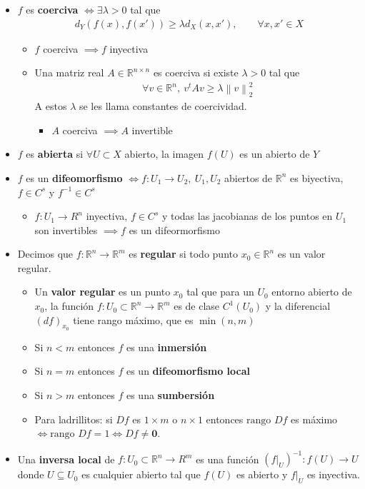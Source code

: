 \documentclass[a4paper,twocolumn]{extarticle}
\newcommand{\R}{\mathbb{R}}
\newcommand{\norma}[1]{\left\lVert#1\right\rVert}
\begin{document}
\begin{itemize}
	\item $f$ es \textbf{coerciva} $\iff \exists \lambda > 0$ tal que
	\begin{align*}
		d_Y(f(x), f(x')) \geq \lambda d_X(x,x'),\qquad \forall x,x' \in X
	\end{align*}
	\begin{itemize}
		\item $f$ coerciva $\implies f$ inyectiva
		\item Una matriz real $A \in \R^{n\times n}$ es coerciva si existe $\lambda > 0$ tal que
		\begin{align*}
			\forall v \in \R^n,\ v^tAv \geq \lambda \norma{v}_2^2
		\end{align*}
		A estos $\lambda$ se les llama constantes de coercividad.
		\begin{itemize}
			\item $A$ coerciva $\implies A$ invertible
		\end{itemize}
	\end{itemize}
	\item $f$ es \textbf{abierta} si $\forall U \subset X$ abierto, la imagen $f(U)$ es un abierto de $Y$
	\item $f$ es un \textbf{difeomorfismo} $\iff f: U_1 \to U_2,\ U_1,U_2$ abiertos de $\R^n$ es biyectiva, $f \in C^s$ y $f^{-1} \in C^s$
	\begin{itemize}
		\item $f:U_1 \to R^n$ inyectiva, $f \in C^s$ y todas las jacobianas de los puntos en $U_1$ son invertibles $\implies f$ es un difeormorfismo
	\end{itemize}

	\item Decimos que $f:\R^n \to \R^m$ es \textbf{regular} si todo punto $x_0 \in \R^n$ es un valor regular.
	\begin{itemize}
		\item Un \textbf{valor regular} es un punto $x_0$ tal que para un $U_0$ entorno abierto de $x_0$, la función $f:U_0 \subset \R^n \to \R^m$ es de clase $C^1(U_0)$ y la diferencial $(df)_{x_0}$ tiene rango máximo, que es $\min(n, m)$
		\item Si $n < m$ entonces $f$ es una \textbf{inmersión}
		\item Si $n = m$ entonces $f$ es un \textbf{difeomorfismo local}
		\item Si $n > m$ entonces $f$ es una \textbf{sumbersión}
		\item Para ladrillitos: si $Df$ es $1\times m$ o $n \times 1$ entonces $\text{rango } Df$ es máximo $\iff \text{rango } Df = 1 \iff Df \neq \mathbf{0}$.
	\end{itemize}
	\item Una \textbf{inversa local} de $f:U_0 \subset \R^n \to R^m$ es una función $(f|_U)^{-1} : f(U) \to U$ donde $U \subseteq U_0$ es cualquier abierto tal que $f(U)$ es abierto y $f|_U$ es inyectiva.

\end{itemize}
\end{document}
